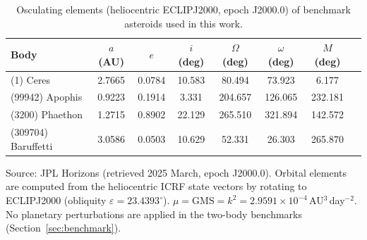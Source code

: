 
\begin{table}
\centering
\caption{
  Osculating elements (heliocentric ECLIPJ2000, epoch J2000.0)
  of benchmark asteroids used in this work.
  \label{tab:elements}
}
\begin{tabular}{lccccccc}
\toprule
Body & $a$ (AU) & $e$ & $i$ (deg) & $\Omega$ (deg) & $\omega$ (deg) & $M$ (deg) \\
\midrule
(1) Ceres        & 2.7665 & 0.0784 & 10.583 &  80.494 &  73.923 &   6.177 \\
(99942) Apophis  & 0.9223 & 0.1914 &  3.331 & 204.657 & 126.065 & 232.181 \\
(3200) Phaethon  & 1.2715 & 0.8902 & 22.129 & 265.510 & 321.894 & 142.572 \\
(309704) Baruffetti & 3.0586 & 0.0503 & 10.629 &  52.331 &  26.303 & 265.870 \\
\bottomrule
\end{tabular}

\medskip
\parbox{0.95\textwidth}{\footnotesize
Source: JPL Horizons (retrieved 2025 March, epoch J2000.0).
Orbital elements are computed from the heliocentric ICRF state vectors
by rotating to ECLIPJ2000 (obliquity $\varepsilon=23.4393^\circ$).
$\mu = \mathrm{GMS} = k^2 = 2.9591\times10^{-4}$\,AU$^3$\,day$^{-2}$.
No planetary perturbations are applied in the two-body benchmarks
(Section~\ref{sec:benchmark}).
}
\end{table}
